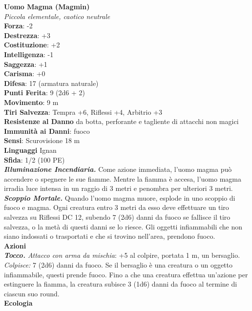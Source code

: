 \begin{multicols}{2}
\medskip\textbf{Uomo Magma (Magmin)}\\
\emph{Piccola elementale, caotico neutrale}\\
\textbf{Forza}: -2\\
\textbf{Destrezza}: +3\\
\textbf{Costituzione}: +2\\
\textbf{Intelligenza}: -1\\
\textbf{Saggezza}: +1\\
\textbf{Carisma}: +0\\
\textbf{Difesa}: 17 (armatura naturale)\\
\textbf{Punti Ferita}: 9 (2d6 + 2)\\
\textbf{Movimento}: 9 m\\
\textbf{Tiri Salvezza}: Tempra +6, Riflessi +4, Arbitrio +3\\
\textbf{Resistenze al Danno} da botta, perforante e tagliente di attacchi non magici\\
\textbf{Immunità ai Danni}: fuoco\\
\textbf{Sensi}: Scurovisione 18 m\\
\textbf{Linguaggi} Ignan\\
\textbf{Sfida}: 1/2 (100 PE)\smallskip\\
\emph{\textbf{Illuminazione Incendiaria.}} Come azione immediata, l'uomo magma può accendere o spegnere le sue fiamme. Mentre la fiamma è accesa, l'uomo magma irradia luce intensa in un raggio di 3 metri e penombra per ulteriori 3 metri.\\
\emph{\textbf{Scoppio Mortale.}} Quando l'uomo magma muore, esplode in uno scoppio di fuoco e magma. Ogni creatura entro 3 metri da esso deve effettuare un tiro salvezza su Riflessi DC  12, subendo 7 (2d6) danni da fuoco se fallisce il tiro salvezza, o la metà di questi danni se lo riesce. Gli oggetti infiammabili che non siano indossati o trasportati e che si trovino nell'area, prendono fuoco.\\
\smallskip\textbf{Azioni}\\
\emph{\textbf{Tocco.} Attacco con arma da mischia}: +5 al colpire, portata 1 m, un bersaglio.\\
\emph{Colpisce:} 7 (2d6) danni da fuoco. Se il bersaglio è una creatura o un oggetto infiammabile, questi prende fuoco. Fino a che una creatura effettua un'azione per estinguere la fiamma, la creatura subisce 3 (1d6) danni da fuoco al termine di ciascun suo round.\\
\textbf{Ecologia}\\

\end{multicols}
